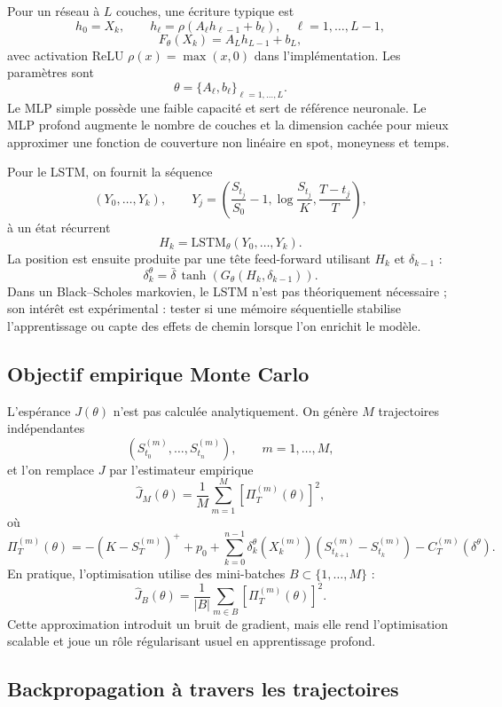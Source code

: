 \documentclass[11pt,a4paper]{article}
\begin{document}
Pour un réseau à $L$ couches, une écriture typique est
\[
h_0=X_k,\qquad
h_{\ell}=\rho(A_{\ell}h_{\ell-1}+b_{\ell}),
\quad \ell=1,\ldots,L-1,
\]
\[
F_\theta(X_k)=A_Lh_{L-1}+b_L,
\]
avec activation ReLU $\rho(x)=\max(x,0)$ dans l'implémentation. Les paramètres
sont
\[
\theta=\{A_\ell,b_\ell\}_{\ell=1,\ldots,L}.
\]
Le MLP simple possède une faible capacité et sert de référence neuronale. Le
MLP profond augmente le nombre de couches et la dimension cachée pour mieux
approximer une fonction de couverture non linéaire en spot, moneyness et temps.

Pour le LSTM, on fournit la séquence
\[
(Y_0,\ldots,Y_k),
\qquad
Y_j=\left(\frac{S_{t_j}}{S_0}-1,\log\frac{S_{t_j}}{K},\frac{T-t_j}{T}\right),
\]
à un état récurrent
\[
H_k=\mathrm{LSTM}_\theta(Y_0,\ldots,Y_k).
\]
La position est ensuite produite par une tête feed-forward utilisant $H_k$ et
$\delta_{k-1}$ :
\[
\delta_k^\theta
=
\bar{\delta}\,
\tanh\left(G_\theta(H_k,\delta_{k-1})\right).
\]
Dans un Black--Scholes markovien, le LSTM n'est pas théoriquement nécessaire ;
son intérêt est expérimental : tester si une mémoire séquentielle stabilise
l'apprentissage ou capte des effets de chemin lorsque l'on enrichit le modèle.

\subsection{Objectif empirique Monte Carlo}

L'espérance $J(\theta)$ n'est pas calculée analytiquement. On génère
$M$ trajectoires indépendantes
\[
\left(S^{(m)}_{t_0},\ldots,S^{(m)}_{t_n}\right),
\qquad m=1,\ldots,M,
\]
et l'on remplace $J$ par l'estimateur empirique
\[
\widehat{J}_M(\theta)
=
\frac1M
\sum_{m=1}^{M}
\left[
\Pi_T^{(m)}(\theta)
\right]^2,
\]
où
\[
\Pi_T^{(m)}(\theta)
=
-\left(K-S_T^{(m)}\right)^+
+p_0
+\sum_{k=0}^{n-1}
\delta_k^\theta\!\left(X_k^{(m)}\right)
\left(S_{t_{k+1}}^{(m)}-S_{t_k}^{(m)}\right)
-C_T^{(m)}(\delta^\theta).
\]
En pratique, l'optimisation utilise des mini-batches $B\subset\{1,\ldots,M\}$ :
\[
\widehat{J}_B(\theta)
=
\frac1{|B|}
\sum_{m\in B}
\left[
\Pi_T^{(m)}(\theta)
\right]^2.
\]
Cette approximation introduit un bruit de gradient, mais elle rend
l'optimisation scalable et joue un rôle régularisant usuel en apprentissage
profond.

\subsection{Backpropagation à travers les trajectoires}
\end{document}

